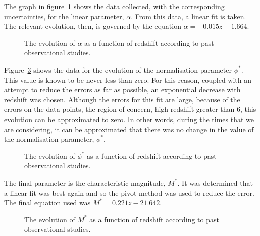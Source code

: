             The graph in figure~\ref{fig:alpha_evolution} shows the data collected, with the corresponding uncertainties, for the linear parameter, $\alpha$. From this data, a linear fit is taken. The relevant evolution, then, is governed by the equation $\alpha = -0.015z - 1.664$.
            \begin{figure}[!htb]
                \centering
                    \begingroup{}
                        \resizebox{0.6\textwidth}{!}{%
                            
                        }\endgroup
                \caption{The evolution of $\alpha$ as a function of redshift according to past observational studies.\label{fig:alpha_evolution}}
            \end{figure}

            Figure~\ref{fig:phi_evolution} shows the data for the evolution of the normalisation parameter $\phi^{*}$. This value is known to be never less than zero. For this reason, coupled with an attempt to reduce the errors as far as possible, an exponential decrease with redshift was chosen. Although the errors for this fit are large, because of the errors on the data points, the region of concern, high redshift greater than 6, this evolution can be approximated to zero. In other words, during the times that we are considering, it can be approximated that there was no change in the value of the normalisation parameter, $\phi^*$.
            \begin{figure}[!htb]
                \centering
                    \begingroup{}
                        \resizebox{0.6\textwidth}{!}{%
                            
                        }\endgroup
                \caption{The evolution of $\phi^{*}$ as a function of redshift according to past observational studies.\label{fig:phi_evolution}}
            \end{figure}

            The final parameter is the characteristic magnitude, $M^*$. It was determined that a linear fit was best again and so the pivot method was used to reduce the error. The final equation used was $M^* = 0.221z - 21.642$.
            \begin{figure}[!htb]
                \centering
                    \begingroup{}
                        \resizebox{0.6\textwidth}{!}{%
                            
                        }\endgroup
                \caption{The evolution of $M^{*}$ as a function of redshift according to past observational studies.\label{fig:phi_evolution}}
            \end{figure}

